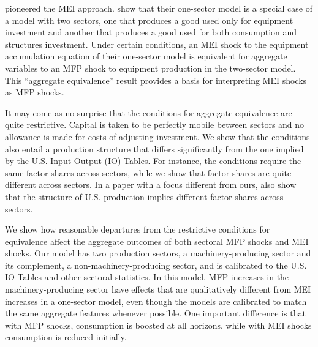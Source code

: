 \documentclass[12pt,fleqn]{article}
\begin{document}
 pioneered the MEI approach.  show that their one-sector model is a special case of a
model with two sectors, one that produces a good used only for equipment
investment and another that produces a good used for both consumption and
structures investment. Under certain conditions, an MEI shock to the equipment accumulation equation of their one-sector model is equivalent for aggregate variables
to an MFP shock to equipment production in the
two-sector model. This ``aggregate equivalence'' result provides a
basis for interpreting MEI shocks as MFP shocks.

It may come as no surprise that the conditions for aggregate equivalence are
quite restrictive. Capital is taken to be perfectly mobile between sectors
and no allowance is made for costs of adjusting investment. We show that the
conditions also entail a production structure that differs significantly
from the one implied by the U.S. Input-Output (IO) Tables. For instance, the
conditions require the same factor shares across sectors, while we show that
factor shares are quite different across sectors. In a paper with a focus
different from ours,  also show that the structure of U.S.
production implies different factor shares across sectors.

We show how reasonable departures from the restrictive conditions for equivalence
affect the aggregate outcomes of both sectoral MFP shocks and MEI shocks. Our
model has two production sectors, a machinery-producing sector and its complement, a non-machinery-producing sector, and is calibrated to the U.S. IO Tables and
other sectoral statistics. In this
model, MFP increases in the machinery-producing sector have effects that are
qualitatively different from MEI increases in a one-sector model, even
though the models are calibrated to match the same aggregate features
whenever possible. One important difference is that with MFP shocks,
consumption is boosted at all horizons, while with MEI shocks consumption is
reduced initially.
\end{document}
